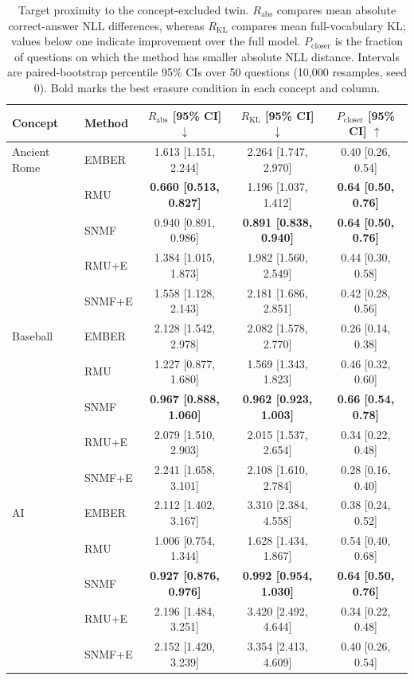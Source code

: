 \begin{table}[t]
  \centering
  \small
  \begin{tabular}{llccc}
    \toprule
    Concept & Method & $R_{\mathrm{abs}}$ [95\% CI] $\downarrow$
      & $R_{\mathrm{KL}}$ [95\% CI] $\downarrow$
      & $P_{\mathrm{closer}}$ [95\% CI] $\uparrow$ \\
    \midrule
    Ancient Rome & EMBER & 1.613 [1.151, 2.244] & 2.264 [1.747, 2.970] & 0.40 [0.26, 0.54] \\
                 & RMU   & \textbf{0.660 [0.513, 0.827]} & 1.196 [1.037, 1.412] & \textbf{0.64 [0.50, 0.76]} \\
                 & SNMF  & 0.940 [0.891, 0.986] & \textbf{0.891 [0.838, 0.940]} & \textbf{0.64 [0.50, 0.76]} \\
                 & RMU+E & 1.384 [1.015, 1.873] & 1.982 [1.560, 2.549] & 0.44 [0.30, 0.58] \\
                 & SNMF+E & 1.558 [1.128, 2.143] & 2.181 [1.686, 2.851] & 0.42 [0.28, 0.56] \\
    \midrule
    Baseball     & EMBER & 2.128 [1.542, 2.978] & 2.082 [1.578, 2.770] & 0.26 [0.14, 0.38] \\
                 & RMU   & 1.227 [0.877, 1.680] & 1.569 [1.343, 1.823] & 0.46 [0.32, 0.60] \\
                 & SNMF  & \textbf{0.967 [0.888, 1.060]} & \textbf{0.962 [0.923, 1.003]} & \textbf{0.66 [0.54, 0.78]} \\
                 & RMU+E & 2.079 [1.510, 2.903] & 2.015 [1.537, 2.654] & 0.34 [0.22, 0.48] \\
                 & SNMF+E & 2.241 [1.658, 3.101] & 2.108 [1.610, 2.784] & 0.28 [0.16, 0.40] \\
    \midrule
    AI           & EMBER & 2.112 [1.402, 3.167] & 3.310 [2.384, 4.558] & 0.38 [0.24, 0.52] \\
                 & RMU   & 1.006 [0.754, 1.344] & 1.628 [1.434, 1.867] & 0.54 [0.40, 0.68] \\
                 & SNMF  & \textbf{0.927 [0.876, 0.976]} & \textbf{0.992 [0.954, 1.030]} & \textbf{0.64 [0.50, 0.76]} \\
                 & RMU+E & 2.196 [1.484, 3.251] & 3.420 [2.492, 4.644] & 0.34 [0.22, 0.48] \\
                 & SNMF+E & 2.152 [1.420, 3.239] & 3.354 [2.413, 4.609] & 0.40 [0.26, 0.54] \\
    \bottomrule
  \end{tabular}
  \caption{Target proximity to the concept-excluded twin.
  $R_{\mathrm{abs}}$ compares mean absolute correct-answer NLL differences,
  whereas $R_{\mathrm{KL}}$ compares mean full-vocabulary KL; values below one
  indicate improvement over the full model. $P_{\mathrm{closer}}$ is the
  fraction of questions on which the method has smaller absolute NLL distance.
  Intervals are paired-bootstrap percentile 95\% CIs over 50 questions (10,000
  resamples, seed 0). Bold marks the best erasure condition in each concept
  and column.}
  \label{tab:question-level-similarity}
\end{table}

